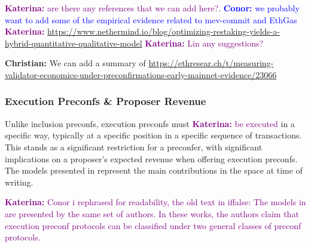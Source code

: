 \documentclass[a4paper]{article}
\theoremstyle{boldstyle}
\newcommand{\cm}[1]{\textcolor{blue}{\textbf{Conor:} #1}}
\newcommand{\ks}[1]{\textcolor{purple}{\textbf{Katerina:} #1}}
\newcommand{\chm}[1]{\textcolor{OliveGreen}{\textbf{Christian:} #1}}
\begin{document}
     \ks{are there any references that we can add here?}. 
     \cm{we probably want to add some of the empirical evidence related to mev-commit and EthGas}
     \ks{\url{https://www.nethermind.io/blog/optimizing-restaking-yields-a-hybrid-quantitative-qualitative-model}} \ks{Lin any suggestions?}
    
     \chm{We can add a summary of \url{https://ethresear.ch/t/measuring-validator-economics-under-preconfirmations-early-mainnet-evidence/23066}}
    
    \subsubsection{Execution Preconfs \& Proposer Revenue}\label{sec:execpreconfproposerrevenue}
    Unlike inclusion preconfs, execution preconfs must \ks{ be executed} in a specific way, typically at a specific position in a specific sequence of transactions. This stands as a significant restriction for a preconfer, with significant implications on a proposer's expected revenue when offering execution preconfs. The models presented in \cite{W:EstimatingtheRevenuefromIndependentSub-SlotAuctionPreconfirmations, W:AnalysingExpectedProposerRevenuefromPreconfirmations, W:PreconfirmationsundertheNOlens} represent the main contributions in the space at time of writing. 
    
    \ks{Conor i rephrased for readability, the old text in iffalse: The models in \cite{W:EstimatingtheRevenuefromIndependentSub-SlotAuctionPreconfirmations, W:AnalysingExpectedProposerRevenuefromPreconfirmations} are presented by the same set of authors. In these works, the authors claim that execution preconf protocols can be classified under two general classes of preconf protocols.  }
    
\end{document}

